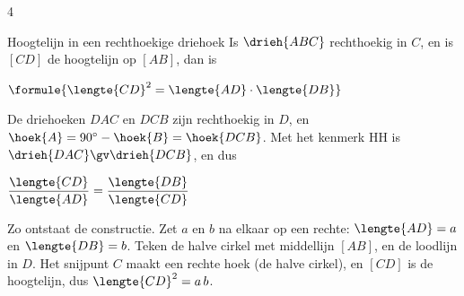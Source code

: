 \begin{alleenvoor}{4}
\begin{theorie}
\begin{minipage}[t]{.6\linewidth}
\vspace{0pt}
\begin{stelling}{Hoogtelijn in een rechthoekige driehoek}
Is $\drieh{ABC}$ rechthoekig in $C$, en is $[CD]$ de hoogtelijn op $[AB]$, dan is

\vspace{1mm}
\qquad $\formule{\lengte{CD}^2 = \lengte{AD} \cdot \lengte{DB}}$
\end{stelling}

\begin{bewijs}
De driehoeken $DAC$ en $DCB$ zijn rechthoekig in $D$, en $\hoek{A} = 90^\circ - \hoek{B} = \hoek{DCB}$. Met het kenmerk HH is ${\drieh{DAC} \gv \drieh{DCB}}$, en dus

\vspace{1mm}
\qquad $\dfrac{\lengte{CD}}{\lengte{AD}} = \dfrac{\lengte{DB}}{\lengte{CD}}$
\end{bewijs}
\end{minipage}\hfill
\begin{minipage}[t]{.36\linewidth}
\vspace{0pt}
\centering
{}
\end{minipage}
\end{theorie}
\end{alleenvoor}

Zo ontstaat de constructie. Zet $a$ en $b$ na elkaar op een rechte: $\lengte{AD} = a$ en $\lengte{DB} = b$. Teken de halve cirkel met middellijn $[AB]$, en de loodlijn in $D$. Het snijpunt $C$ maakt een rechte hoek (de halve cirkel), en $[CD]$ is de hoogtelijn, dus $\lengte{CD}^2 = a\,b$.


